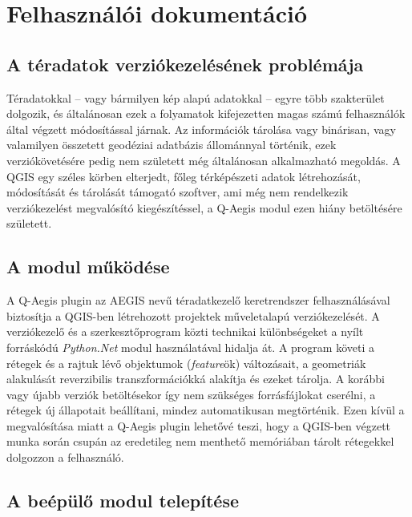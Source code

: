 \chapter{Felhasználói dokumentáció}
\label{ch:user}
\section{A téradatok verziókezelésének problémája}
Téradatokkal -- vagy bármilyen kép alapú adatokkal -- egyre több szakterület dolgozik, és általánosan ezek a folyamatok kifejezetten magas számú felhasználók által végzett módosítással járnak. Az információk tárolása vagy binárisan, vagy valamilyen összetett geodéziai adatbázis állománnyal történik, ezek verziókövetésére pedig nem született még általánosan alkalmazható megoldás. A QGIS egy széles körben elterjedt, főleg térképészeti adatok létrehozását, módosítását és tárolását támogató szoftver, ami még nem rendelkezik verziókezelést megvalósító kiegészítéssel, a Q-Aegis modul ezen hiány betöltésére született.
\section{A modul működése}
A Q-Aegis plugin az AEGIS nevű téradatkezelő keretrendszer felhasználásával biztosítja a QGIS-ben létrehozott projektek műveletalapú verziókezelését. A verziókezelő és a szerkesztőprogram közti technikai különbségeket a nyílt forráskódú \emph{Python.Net} \cite{pythonnet} modul használatával hidalja át. A program követi a rétegek és a rajtuk lévő objektumok (\emph{feature}ök) változásait, a geometriák alakulását reverzibilis transzformációkká alakítja és ezeket tárolja. A korábbi vagy újabb verziók betöltésekor így nem szükséges forrásfájlokat cserélni, a rétegek új állapotait beállítani, mindez automatikusan megtörténik. Ezen kívül a megvalósítása miatt a Q-Aegis plugin lehetővé teszi, hogy a QGIS-ben végzett munka során csupán az eredetileg nem menthető memóriában tárolt rétegekkel dolgozzon a felhasználó.

\section{A beépülő modul telepítése}
